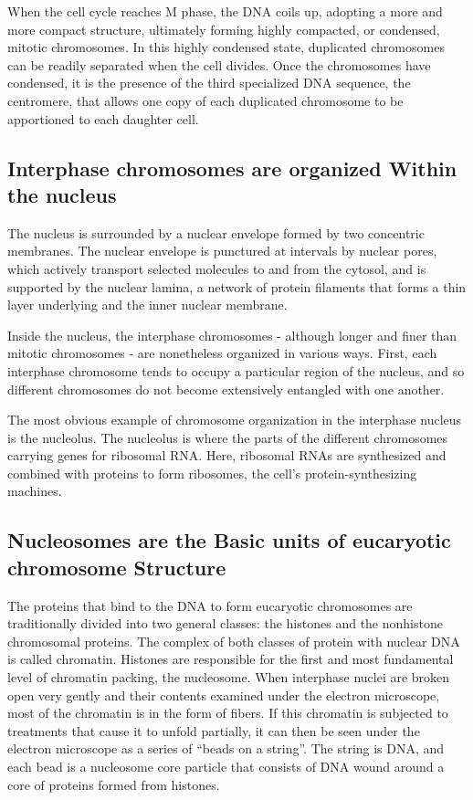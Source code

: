 When the cell cycle reaches M phase, the DNA coils up, adopting a more
and more compact structure, ultimately forming highly compacted, or
condensed, mitotic chromosomes. In this highly condensed state, duplicated
chromosomes can be readily separated when the cell divides.
Once the chromosomes have condensed, it is the presence of the
third specialized DNA sequence, the centromere, that allows one copy
of each duplicated chromosome to be apportioned to each daughter cell.

\subsection{Interphase chromosomes are organized Within the nucleus}

The nucleus is surrounded by a nuclear envelope formed by two concentric
membranes. The nuclear envelope is punctured at intervals by
nuclear pores, which actively transport selected molecules to and from
the cytosol, and is supported by the
nuclear lamina, a network of protein filaments that forms a thin layer
underlying and the inner nuclear membrane.

Inside the nucleus, the interphase chromosomes - although longer and
finer than mitotic chromosomes - are nonetheless organized in various
ways. First, each interphase chromosome tends to occupy a particular
region of the nucleus, and so different chromosomes do not become
extensively entangled with one another.

The most obvious example of chromosome organization in the interphase
nucleus is the nucleolus. The nucleolus is where the
parts of the different chromosomes carrying genes for ribosomal RNA.
Here, ribosomal RNAs are synthesized and combined with proteins to
form ribosomes, the cell’s protein-synthesizing machines.

\subsection{Nucleosomes are the Basic units of eucaryotic chromosome Structure}

The proteins that bind to the DNA to form eucaryotic chromosomes
are traditionally divided into two general classes: the histones and the
nonhistone chromosomal proteins.
The complex of both classes of protein with nuclear DNA is called chromatin.
Histones are responsible for the first and most fundamental level of chromatin
packing, the nucleosome. When interphase nuclei are broken open very gently
and their contents examined under the electron microscope, most of the chromatin is in the form
of fibers. If this chromatin is subjected
to treatments that cause it to unfold partially, it can
then be seen under the electron microscope as a series of “beads on
a string”. The string is DNA, and each bead is a nucleosome
core particle that consists of DNA wound around a core of proteins formed from histones.

